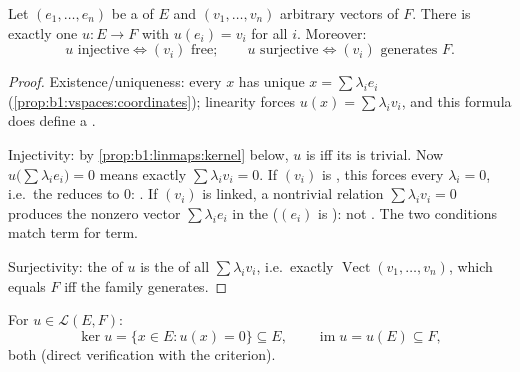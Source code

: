 \begin{proposition}\label{prop:b1:linmaps:basis}
Let $(e_1, \dots, e_n)$ be a  of $E$ and $(v_1, \dots, v_n)$
arbitrary vectors of $F$. There is exactly one  $u \colon
E \to F$ with $u(e_i) = v_i$ for all $i$. Moreover:
\[
u \text{ injective} \iff (v_i) \text{ free};
\qquad
u \text{ surjective} \iff (v_i) \text{ generates } F .
\]
\end{proposition}

\begin{proof}
Existence/uniqueness: every $x$ has unique  $x = \sum
\lambda_i e_i$ (\cref{prop:b1:vspaces:coordinates}); linearity
forces $u(x) = \sum \lambda_i v_i$, and this formula does define a
.

Injectivity: by \cref{prop:b1:linmaps:kernel} below, $u$ is
 iff its  is trivial. Now $u\bigl(\sum\lambda_i
e_i\bigr) = 0$ means exactly $\sum\lambda_i v_i = 0$. If $(v_i)$
is , this forces every $\lambda_i = 0$, i.e.\ the 
reduces to $0$: . If $(v_i)$ is linked, a nontrivial
relation $\sum\lambda_i v_i = 0$ produces the nonzero vector
$\sum\lambda_i e_i$ in the  ($(e_i)$ is ): not
. The two conditions match term for term.

Surjectivity: the  of $u$ is the  of all $\sum\lambda_i
v_i$, i.e.\ exactly $\operatorname{Vect}(v_1, \dots, v_n)$, which
equals $F$ iff the family generates.
\end{proof}

\begin{definition}\label{def:b1:linmaps:kerim}
For $u \in \mathcal{L}(E, F)$:
\[
\ker u = \{x \in E : u(x) = 0\} \subseteq E,
\qquad
\operatorname{im} u = u(E) \subseteq F ,
\]
both  (direct verification with the
criterion).
\end{definition}

